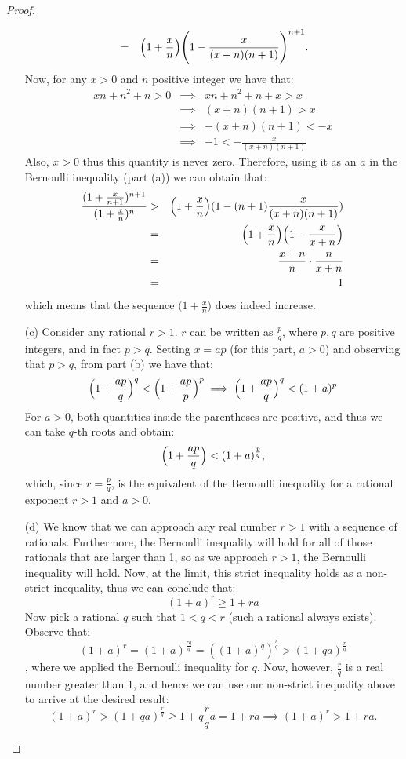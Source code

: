 \begin{proof}
\begin{enumerate}
\begin{eqnarray*}
        & = & \Bigl(1+\frac{x}{n}\Bigr) \Biggl(1 - \frac{x}{(x+n)(n+1)}\Biggr)^{n+1}.
    \end{eqnarray*}
    Now, for any $x > 0$ and $n$ positive integer we have that:
    \begin{eqnarray*}
        xn +n^2+n > 0 
        & \implies & xn + n^2 + n + x > x\\
        & \implies & (x+n)(n+1) > x\\
        & \implies & - (x+n)(n+1) < -x\\
        & \implies & -1 < -\frac{x}{(x+n)(n+1)}
    \end{eqnarray*}
    Also, $x > 0$ thus this quantity is never zero. Therefore, using it as an $a$ in the Bernoulli inequality (part (a)) we can obtain that:
    \begin{eqnarray*}
        \frac{(1+\frac{x}{n+1})^{n+1}}{(1+\frac{x}{n})^n} & > & \Bigl(1+\frac{x}{n}\Bigr)(1 - (n+1)\frac{x}{(x+n)(n+1)})\\
        & = & \Bigl(1+\frac{x}{n}\Bigr)\Bigl(1 - \frac{x}{x+n}\Bigr)\\
        & = & \frac{x+n}{n}\cdot\frac{n}{x+n}\\
        & = & 1
    \end{eqnarray*}
    which means that the sequence $\bigl(1+\frac{x}{n}\bigr)$ does indeed increase.
    \item[(c)] Consider any rational $r > 1$. $r$ can be written as $\frac{p}{q}$, where $p, q$ are positive integers, and in fact $p > q$. Setting $x = ap$ (for this part, $a > 0$) and observing that $p > q$, from part (b) we have that: 
    $$\Bigl(1 + \frac{ap}{q}\Bigr)^q < \Bigl(1+\frac{ap}{p}\Bigr)^p \implies \Bigl(1 + \frac{ap}{q}\Bigr)^q < (1 + a)^p$$
    For $a > 0$, both quantities inside the parentheses are positive, and thus we can take $q$-th roots and obtain:
    $$\Bigl(1 + \frac{ap}{q}\Bigr) < (1+a)^{\frac{p}{q}},$$
    which, since $r = \frac{p}{q}$, is the equivalent of the Bernoulli inequality for a rational exponent $r > 1$ and $ a > 0$.
    \item[(d)] We know that we can approach any real number $r > 1$ with a sequence of rationals. Furthermore, the Bernoulli inequality will hold for all of those rationals that are larger than 1, so as we approach $r > 1$, the Bernoulli inequality will hold. Now, at the limit, this strict inequality holds as a non-strict inequality, thus we can conclude that:
    $$(1+a)^r \geq 1 + ra$$
    Now pick a rational $q$ such that $1 < q < r$ (such a rational always exists). Observe that:
    $$(1+a)^r = (1+a)^{\frac{rq}{q}} = ((1+a)^q)^{\frac{r}{q}} > (1+qa)^{\frac{r}{q}}$$
    , where we applied the Bernoulli inequality for $q$. Now, however, $\frac{r}{q}$ is a real number greater than 1, and hence we can use our non-strict inequality above to arrive at the desired result:
    $$(1+a)^r > (1+qa)^{\frac{r}{q}} \geq 1 + q\frac{r}{q}a = 1 + ra \implies (1+a)^r > 1 + ra.$$
    \end{enumerate}
\end{proof}


